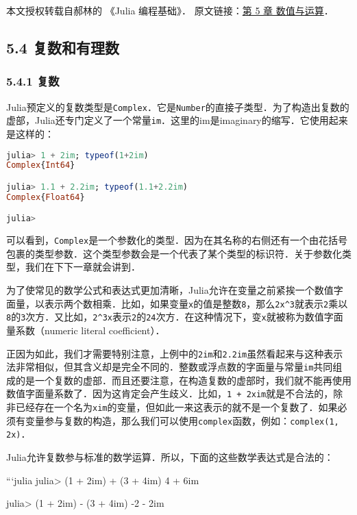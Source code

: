 
本文授权转载自郝林的 《Julia 编程基础》． 原文链接：\href{https://github.com/hyper0x/JuliaBasics/blob/master/book/ch05.md}{第 5 章 数值与运算}．


\subsection{5.4 复数和有理数}

\subsubsection{5.4.1 复数}

Julia预定义的复数类型是\verb|Complex|．它是\verb|Number|的直接子类型．为了构造出复数的虚部，Julia还专门定义了一个常量\verb|im|．这里的im是imaginary的缩写．它使用起来是这样的：
\begin{lstlisting}[language=julia]
julia> 1 + 2im; typeof(1+2im)
Complex{Int64}

julia> 1.1 + 2.2im; typeof(1.1+2.2im)
Complex{Float64}

julia> 
\end{lstlisting}

可以看到，\verb|Complex|是一个参数化的类型．因为在其名称的右侧还有一个由花括号包裹的类型参数．这个类型参数会是一个代表了某个类型的标识符．关于参数化类型，我们在下下一章就会讲到．

为了使常见的数学公式和表达式更加清晰，Julia允许在变量之前紧挨一个数值字面量，以表示两个数相乘．比如，如果变量\verb|x|的值是整数\verb|8|，那么\verb|2x^3|就表示\verb|2|乘以\verb|8|的\verb|3|次方．又比如，\verb|2^3x|表示\verb|2|的\verb|24|次方．在这种情况下，变\verb|x|就被称为数值字面量系数（numeric literal coefficient）．

正因为如此，我们才需要特别注意，上例中的\verb|2im|和\verb|2.2im|虽然看起来与这种表示法非常相似，但其含义却是完全不同的．整数或浮点数的字面量与常量\verb|im|共同组成的是一个复数的虚部．而且还要注意，在构造复数的虚部时，我们就不能再使用数值字面量系数了．因为这肯定会产生歧义．比如，\verb|1 + 2xim|就是不合法的，除非已经存在一个名为\verb|xim|的变量，但如此一来这表示的就不是一个复数了．如果必须有变量参与复数的构造，那么我们可以使用\verb|complex|函数，例如：\verb|complex(1, 2x)|．

Julia允许复数参与标准的数学运算．所以，下面的这些数学表达式是合法的：

```julia
julia> (1 + 2im) + (3 + 4im)
4 + 6im

julia> (1 + 2im) - (3 + 4im)
-2 - 2im

